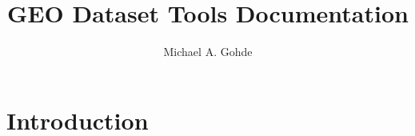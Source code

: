 \documentclass[12pt,letterpaper]{article}
\begin{document}
\title{GEO Dataset Tools Documentation}
\author{Michael A. Gohde}
\maketitle

\section{Introduction}
\end{document}
